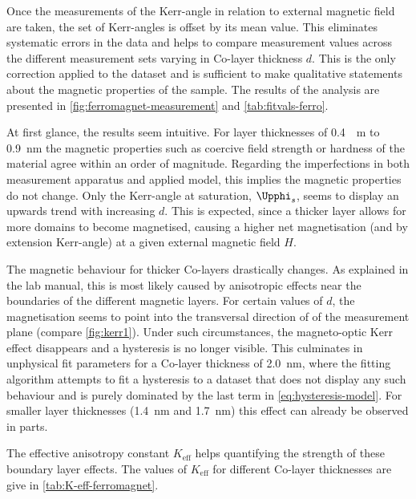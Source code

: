 Once the measurements of the Kerr-angle in relation to external magnetic field are
taken, the set of Kerr-angles is offset by its mean value. This eliminates systematic
errors in the data and helps to compare measurement values across the different 
measurement sets varying in Co-layer thickness $d$. This is the only correction 
applied to the dataset and is sufficient to make qualitative statements about the 
magnetic properties of the sample. The results of the analysis are presented in 
\autoref{fig:ferromagnet-measurement} and \autoref{tab:fitvals-ferro}.

At first glance, the results seem intuitive. For layer thicknesses of \SI{0.4}{\nano
\meter} to \SI{0.9}{\nano\meter} the magnetic properties such as coercive field 
strength or hardness of the material agree within an order of magnitude. Regarding 
the imperfections in both measurement apparatus and applied model, this implies 
the magnetic properties do not change. Only the Kerr-angle at saturation, $\Upphi_s$,
seems to display an upwards trend with increasing $d$. This is expected, since a
thicker layer allows for more domains to become magnetised, causing a higher net
magnetisation (and by extension Kerr-angle) at a given external magnetic field $H$.

The magnetic behaviour for thicker Co-layers drastically changes. As explained in the
lab manual, this is most likely caused by anisotropic effects near the boundaries of 
the different magnetic layers. For certain values of $d$, the magnetisation seems to 
point into the transversal direction of of the measurement plane (compare 
\autoref{fig:kerr1}). Under such circumstances, the magneto-optic Kerr effect 
disappears and a hysteresis is no longer visible. This culminates in unphysical fit
parameters for a Co-layer thickness of \SI{2.0}{\nano\meter}, where the fitting 
algorithm attempts to fit a hysteresis to a dataset that does not display any such 
behaviour and is purely dominated by the last term in \autoref{eq:hysteresis-model}.
For smaller layer thicknesses (\SI{1.4}{\nano\meter} and \SI{1.7}{\nano\meter}) this 
effect can already be observed in parts.

The effective anisotropy constant $K_\text{eff}$ helps quantifying the strength of
these boundary layer effects. The values of $K_\text{eff}$ for different Co-layer 
thicknesses are give in \autoref{tab:K-eff-ferromagnet}.

